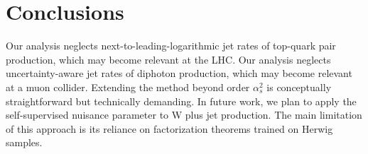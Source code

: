 \section{Conclusions}\label{sec:conclusions}

Our analysis neglects next-to-leading-logarithmic jet rates of top-quark
pair production, which may become relevant at the LHC. Our analysis
neglects uncertainty-aware jet rates of diphoton production, which may
become relevant at a muon collider. Extending the method beyond order
$\alpha_s^2$ is conceptually straightforward but technically demanding.
In future work, we plan to apply the self-supervised nuisance parameter
to W plus jet production. The main limitation of this approach is its
reliance on factorization theorems trained on Herwig samples.

